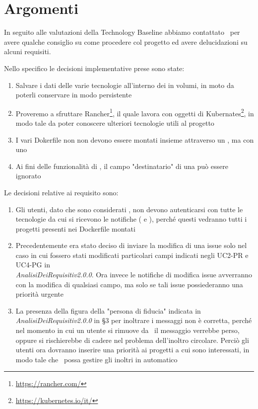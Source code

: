     \section{Argomenti}
    
    In seguito alle valutazioni della Technology Baseline abbiamo contattato \DZ\ per avere qualche consiglio su come procedere col progetto ed avere delucidazioni su alcuni requisiti.
    
    Nello specifico le decisioni implementative prese sono state:
    \begin{enumerate}
        \item Salvare i dati delle varie tecnologie all'interno dei  in volumi, in moto da poterli conservare in modo persistente
        \item Proveremo a sfruttare Rancher\footnote{\url{https://rancher.com/}}, il quale lavora con oggetti di Kubernates\footnote{\url{https://kubernetes.io/it/}}, in modo tale da poter conoscere ulteriori tecnologie utili al progetto
        \item I vari Dokerfile non non devono essere montati insieme attraverso un , ma con uno 
        \item Ai fini delle funzionalità di \progetto, il campo "destinatario" di una  può essere ignorato
    \end{enumerate}

    Le decisioni relative ai requisito sono:
    \begin{enumerate}
        \item Gli utenti, dato che sono considerati , non devono autenticarsi con tutte le tecnologie da cui si ricevono le notifiche ( e ), perché questi vedranno tutti i progetti presenti nei Dockerfile montati
        \item Precedentemente era stato deciso di inviare la modifica di una issue solo nel caso in cui fossero stati modificati particolari campi indicati negli UC2-PR e UC4-PG in\\ \textit{AnalisiDeiRequisitiv2.0.0}. Ora invece le notifiche di modifica issue avverranno con la modifica di qualsiasi campo, ma solo se tali issue possiederanno una priorità urgente
        \item La presenza della figura della "persona di fiducia" indicata in \textit{AnalisiDeiRequisitiv2.0.0} in §3 per inoltrare i messaggi non è corretta, perché nel momento in cui un utente si rimuove da \progetto\ il messaggio verrebbe perso, oppure si rischierebbe di cadere nel problema dell'inoltro circolare. Perciò gli utenti ora dovranno inserire una priorità ai progetti a cui sono interessati, in modo tale che \progetto\ possa gestire gli inoltri in automatico
    \end{enumerate}

